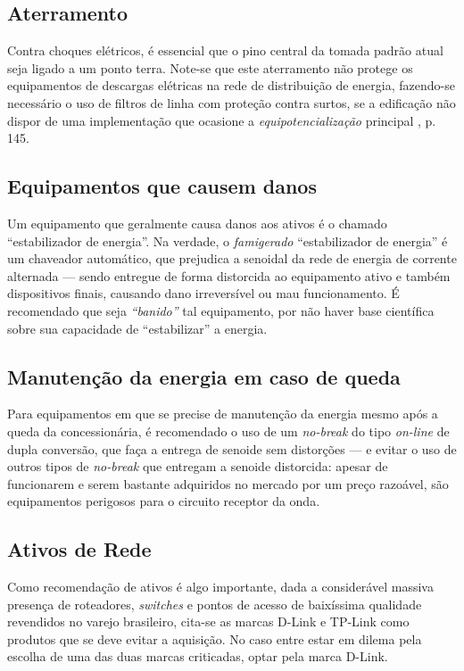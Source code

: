 \documentclass[	DIV=calc,%
							paper=a4,%
							fontsize=12pt,%
							onecolumn]{scrartcl}	 					%
\begin{document}
\subsection{Aterramento}

Contra choques elétricos, é essencial que o pino central da tomada padrão atual seja ligado a um ponto terra. Note-se que este aterramento não protege os equipamentos de descargas elétricas na rede de distribuição de energia, fazendo-se necessário o uso de filtros de linha com proteção contra surtos, se a edificação não dispor de uma implementação que ocasione a \textit{equipotencialização} principal \cite{abnt5410}, p. 145.

\subsection{Equipamentos que causem danos}

Um equipamento que geralmente causa danos aos ativos é o chamado ``estabilizador de energia''. Na verdade, o \textit{famigerado} ``estabilizador de energia'' é um chaveador automático, que prejudica a senoidal da rede de energia de corrente alternada --- sendo entregue de forma distorcida ao equipamento ativo e também dispositivos finais, causando dano irreversível ou mau funcionamento. É recomendado que seja \textit{``banido''} tal equipamento, por não haver base científica sobre sua capacidade de ``estabilizar'' a energia.

\subsection{Manutenção da energia em caso de queda}

Para equipamentos em que se precise de manutenção da energia mesmo após a queda da concessionária, é recomendado o uso de um \textit{no-break} do tipo \textit{on-line} de dupla conversão, que faça a entrega de senoide sem distorções --- e evitar o uso de outros tipos de \textit{no-break} que entregam a senoide distorcida: apesar de funcionarem e serem bastante adquiridos no mercado por um preço razoável, são equipamentos perigosos para o circuito receptor da onda.

\subsection{Ativos de Rede}

Como recomendação de ativos é algo importante, dada a considerável massiva presença de roteadores, \textit{switches} e pontos de acesso de baixíssima qualidade revendidos no varejo brasileiro, cita-se as marcas D-Link e TP-Link como produtos que se deve evitar a aquisição. No caso entre estar em dilema pela escolha de uma das duas marcas criticadas, optar pela marca D-Link. 
\\
\end{document}
